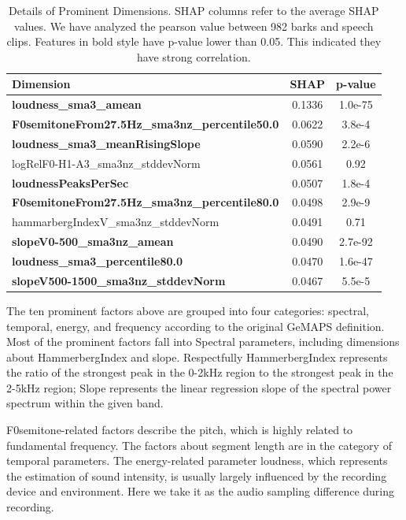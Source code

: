 \begin{table}[th]
	\scriptsize
	\centering
	\begin{tabular}{l|c|c}
		\toprule
		Dimension &SHAP  & p-value\\
		\midrule
		\textbf{loudness\_sma3\_amean} & 0.1336 & {1.0e-75}    \\
		\textbf{F0semitoneFrom27.5Hz\_sma3nz\_percentile50.0} &  0.0622  & {3.8e-4}\\
		\textbf{loudness\_sma3\_meanRisingSlope} &  0.0590  & {2.2e-6}\\
		logRelF0-H1-A3\_sma3nz\_stddevNorm  & 0.0561  & {0.92}\\
		\textbf{loudnessPeaksPerSec} & 0.0507  & {1.8e-4}\\
		\textbf{F0semitoneFrom27.5Hz\_sma3nz\_percentile80.0}  & 0.0498  & {2.9e-9}\\
		hammarbergIndexV\_sma3nz\_stddevNorm & 0.0491  & {0.71}\\
		\textbf{slopeV0-500\_sma3nz\_amean}  & 0.0490 & {2.7e-92}\\
		\textbf{loudness\_sma3\_percentile80.0} & 0.0470  & {1.6e-47}\\
		\textbf{slopeV500-1500\_sma3nz\_stddevNorm}  & 0.0467 & {5.5e-5}\\
		\bottomrule
	\end{tabular}
	\caption{Details of Prominent Dimensions. SHAP columns refer to the average SHAP values. We have analyzed the pearson value between 982 barks and speech clips. Features in bold style have p-value lower than 0.05. This indicated they have strong correlation.}
	\label{table:prominentfactor}
\end{table}

The ten prominent factors above are grouped into four categories: spectral, temporal, energy, and frequency according to the original GeMAPS definition. Most of the prominent factors fall into Spectral parameters, including dimensions about HammerbergIndex and slope. Respectfully HammerbergIndex represents the ratio of the strongest peak in the 0-2kHz region to the strongest peak in the 2-5kHz region; Slope represents the linear regression slope of the spectral power spectrum within the given band.

F0semitone-related factors describe the pitch, which is highly related to fundamental frequency. The factors about segment length are in the category of temporal parameters. The energy-related parameter loudness, which represents the estimation of sound intensity, is usually largely influenced by the recording device and environment. Here we take it as the audio sampling difference during recording.

